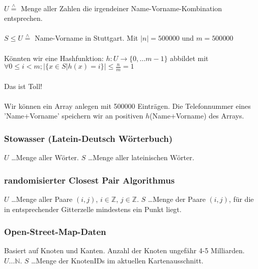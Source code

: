 \paragraph*{} $U \overset{\wedge}{=}$ Menge aller Zahlen die irgendeiner Name-Vorname-Kombination entsprechen.

\paragraph*{} $S \leq U \overset{\wedge}{=}$ Name-Vorname in Stuttgart. Mit $|n| = 500000$ und $m = 500 000$

\paragraph*{} Könnten wir eine Hashfunktion: $h:U \rightarrow \{ 0,\dots m-1 \}$ abbildet mit $\forall 0 \leq i < m ; \big| \{ x\in S | h(x)=i \} \big| \leq \frac{n}{m} = 1$ %

\paragraph*{} Das ist Toll!

\paragraph*{} Wir können ein Array anlegen mit 500000 Einträgen. Die Telefonnummer eines 'Name+Vorname' speichern wir an positiven $h$(Name+Vorname) des Arrays.

\subsubsection{Stowasser (Latein-Deutsch Wörterbuch)}
$U$ \dots Menge aller Wörter. $S$ \dots Menge aller lateinischen Wörter.

\subsubsection{randomisierter Closest Pair Algorithmus}
$U$ \dots Menge aller Paare $(i,j)$, $i \in \mathbb{Z}$, $j \in \mathbb{Z}$. $S$ \dots Menge der Paare $(i,j)$, für die in entsprechender Gitterzelle mindestens ein Punkt liegt.

\subsubsection{Open-Street-Map-Daten}
Basiert auf Knoten und Kanten. Anzahl der Knoten ungefähr 4-5 Milliarden. $U \dots \mathbb{N}$. $S$ \dots Menge der KnotenIDs im aktuellen Kartenausschnitt.

